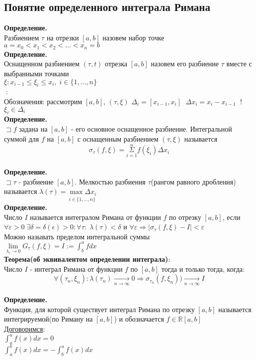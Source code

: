 \documentclass[14pt]{article}
\begin{document}
	\subsection{Понятие определенного интеграла Римана}
	\textbf{Определение.} \\
	Разбиением $\tau$ на отрезки $[a,b]$ назовем набор точке $a=x_0<x_1<x_2<\dots<x_n=b$ \\
	\textbf{Определение.} \\
	Оснащенном разбиением $(\tau,t)$ отрезка $[a,b]$ назовем его разбиение $\tau$ вместе с выбранными точками  \\ 
	$\xi:x_{i-1}\leqslant\xi_i\leqslant x_i, \; i \in \{1,\dots,n \}$ \\
	$\;$: \\
	Обозначения: рассмотрим $[a,b]$, $(\tau,\xi)$ $\Delta_i=[x_{i-1},x_i] \;$ $\Delta x_i = x_i-x_{i-1} \;$ !$\xi_i \in \Delta_i$ \\
	\textbf{Определение.} \\
	$\sqsupset f$ задана на $[a,b]$ - его основное оснащенное разбиение. Интегральной суммой для $f$ на $[a,b]$ с оснащенным разбиением $(\tau,\xi)$ называется \\
	$$\boxed{\sigma_{\tau}(f,\xi)=\underset{i=1}{\overset{n}{\Sigma}}f(\xi_i)\Delta x_i }$$ \\
	\textbf{Определение.} \\
	$\sqsupset \tau$ - разбиение $[a,b]$. Мелкостью разбиения $\tau$(рангом равного дробления) называется $\lambda(\tau)=\underset{i \in \{1,\dots,n \}}{\max\Delta x_i}$ \\
	\textbf{Определение.} \\
	Число $I$ называется интегралом Римана от функции $f$ по отрезку $[a,b]$, если \\
	$\forall \varepsilon > 0 \; \exists \delta = \delta(\epsilon) > 0: \forall \tau: \; \lambda(\tau)<\delta$ и $\forall \varepsilon \Rightarrow |\sigma_{\tau}(f,\xi)-I|<\varepsilon$ \\
	Можно называть пределом интегральной суммы \\
	$\lim\limits_{\lambda_{\tau}\rightarrow0}G_{\tau}(f,\xi)=I:=\int_{b}^{a}fdx$ \\
	\textbf{Теорема(об эквивалентом определении интеграла)}: \\
	Число $I$ - интеграл Римана от функции $f$ по $[a,b]$ тогда и только тогда, когда:\\
	$$\boxed{\forall(\tau_n,\xi_n):\lambda(\tau_n)\underset{n\rightarrow \infty}{\rightarrow} 0 \Rightarrow \sigma_{\tau_n}(f,\xi_n))\underset{n \rightarrow \infty}{\rightarrow} I}$$\\
	\textbf{Определение.} \\
	Функция, для которой существует интеграл Римана по отрезку $[a,b]$ называется интегрируемой(по Риману на $[a,b]$) и обозначается $f \in \mathbb{R}[a,b]$ \\
	\underline{Договоримся}:  \\
	$\int^a_af(x)dx=0$ \\
	$\int^b_af(x)dx=-\int^a_bf(x)dx$\\
\end{document}
